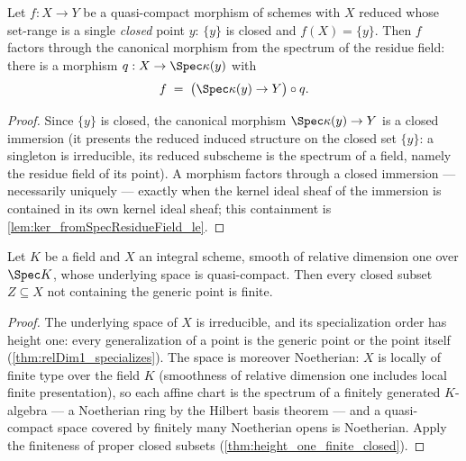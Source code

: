 \begin{theorem}
  \label{thm:hom_factors_fromSpecResidueField}
  \leanok
  Let \(f : X \to Y\) be a quasi-compact morphism of schemes with \(X\) reduced whose
  set-range is a single \emph{closed} point \(y\): \(\{y\}\) is closed and
  \(f(X) = \{y\}\). Then \(f\) factors through the canonical morphism from the spectrum
  of the residue field: there is a morphism \(q : X \to \Spec \kappa(y)\) with
  \[
    f \;=\; \bigl(\Spec \kappa(y) \to Y\bigr) \circ q .
  \]
\end{theorem}
\begin{proof}
  \leanok
  Since \(\{y\}\) is closed, the canonical morphism \(\Spec \kappa(y) \to Y\) is a
  closed immersion (it presents the reduced induced structure on the closed set
  \(\{y\}\): a singleton is irreducible, its reduced subscheme is the spectrum of a
  field, namely the residue field of its point). A morphism factors through a closed
  immersion --- necessarily uniquely --- exactly when the kernel ideal sheaf of the
  immersion is contained in its own kernel ideal sheaf; this containment is
  \ref{lem:ker_fromSpecResidueField_le}.
\end{proof}

\begin{theorem}
  \label{thm:curve_finite_closed}
  \leanok
  Let \(K\) be a field and \(X\) an integral scheme, smooth of relative dimension one
  over \(\Spec K\), whose underlying space is quasi-compact. Then every closed subset
  \(Z \subseteq X\) not containing the generic point is finite.
\end{theorem}
\begin{proof}
  \leanok
  The underlying space of \(X\) is irreducible, and its specialization order has height
  one: every generalization of a point is the generic point or the point itself
  (\ref{thm:relDim1_specializes}). The space is moreover Noetherian: \(X\) is locally of
  finite type over the field \(K\) (smoothness of relative dimension one includes local
  finite presentation), so each affine chart is the spectrum of a finitely generated
  \(K\)-algebra --- a Noetherian ring by the Hilbert basis theorem --- and a
  quasi-compact space covered by finitely many Noetherian opens is Noetherian. Apply
  the finiteness of proper closed subsets (\ref{thm:height_one_finite_closed}).
\end{proof}

